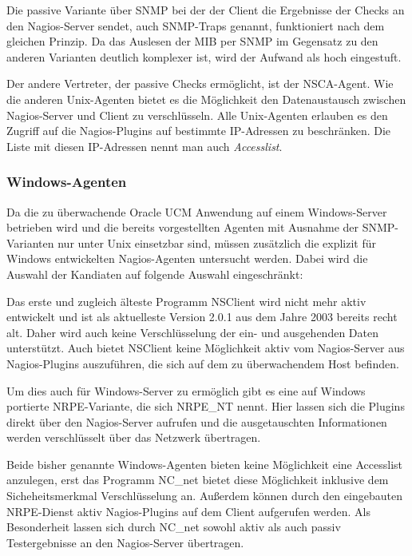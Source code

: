 Die passive Variante über \gls{SNMP} bei der der Client die Ergebnisse der Checks an den Nagios-Server sendet, auch \gls{SNMP}-Traps genannt, funktioniert nach dem gleichen Prinzip.
Da das Auslesen der \gls{MIB} per SNMP im Gegensatz zu den anderen Varianten deutlich komplexer ist, wird der Aufwand als hoch eingestuft.

Der andere Vertreter, der passive Checks ermöglicht, ist der \gls{NSCA}-Agent.
Wie die anderen Unix-Agenten bietet es die Möglichkeit den Datenaustausch zwischen Nagios-Server und Client zu verschlüsseln.
Alle Unix-Agenten erlauben es den Zugriff auf die Nagios-Plugins auf bestimmte \gls{IP}-Adressen zu beschränken.
Die Liste mit diesen \gls{IP}-Adressen nennt man auch \textit{Accesslist}.

\subsubsection{Windows-Agenten}
Da die zu überwachende Oracle UCM Anwendung auf einem Windows-Server betrieben wird und die bereits vorgestellten Agenten mit Ausnahme der \gls{SNMP}-Varianten nur unter Unix einsetzbar sind, müssen zusätzlich die explizit für Windows entwickelten Nagios-Agenten untersucht werden.
Dabei wird die Auswahl der Kandiaten auf folgende Auswahl eingeschränkt:



Das erste und zugleich älteste Programm NSClient wird nicht mehr aktiv entwickelt und ist als aktuelleste Version 2.0.1 aus dem Jahre 2003 bereits recht alt.
Daher wird auch keine Verschlüsselung der ein- und ausgehenden Daten unterstützt.
Auch bietet NSClient keine Möglichkeit aktiv vom Nagios-Server aus Nagios-Plugins auszuführen, die sich auf dem zu überwachendem Host befinden.

Um dies auch für Windows-Server zu ermöglich gibt es eine auf Windows portierte \gls{NRPE}-Variante, die sich NRPE\_NT nennt.
Hier lassen sich die Plugins direkt über den Nagios-Server aufrufen und die ausgetauschten Informationen werden verschlüsselt über das Netzwerk übertragen.

Beide bisher genannte Windows-Agenten bieten keine Möglichkeit eine Accesslist anzulegen, erst das Programm NC\_net bietet diese Möglichkeit inklusive dem Sicheheitsmerkmal Verschlüsselung an.
Außerdem können durch den eingebauten \gls{NRPE}-Dienst aktiv Nagios-Plugins auf dem Client aufgerufen werden.
Als Besonderheit lassen sich durch NC\_net sowohl aktiv als auch passiv Testergebnisse an den Nagios-Server übertragen. 

